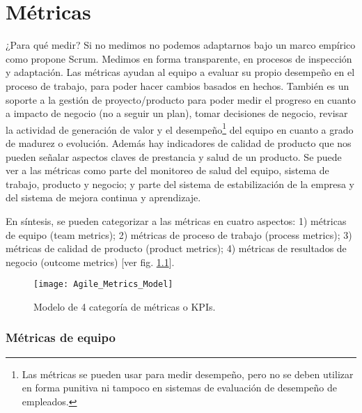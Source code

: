 \chapter{Métricas}

¿Para qué medir? Si no medimos no podemos adaptarnos bajo un marco empírico como propone Scrum. Medimos en forma transparente, en procesos de inspección y adaptación. Las métricas ayudan al equipo a evaluar su propio desempeño en el proceso de trabajo, para poder hacer cambios basados en hechos. También es un soporte a la gestión de proyecto/producto para poder medir el progreso en cuanto a impacto de negocio (no a seguir un plan), tomar decisiones de negocio, revisar la actividad de generación de valor y el desempeño\footnote{Las métricas se pueden usar para medir desempeño, pero no se deben utilizar en forma punitiva ni tampoco en sistemas de evaluación de desempeño de empleados.} del equipo en cuanto a grado de madurez o evolución. Además hay indicadores de calidad de producto que nos pueden señalar aspectos claves de prestancia y salud de un producto. Se puede ver a las métricas como parte del monitoreo de salud del equipo, sistema de trabajo, producto y negocio; y parte del sistema de estabilización de la empresa y del sistema de mejora continua y aprendizaje.

En síntesis, se pueden categorizar a las métricas en cuatro aspectos: 1) métricas de equipo (team metrics); 2) métricas de proceso de trabajo (process metrics); 3) métricas de calidad de producto (product metrics); 4) métricas de resultados de negocio (outcome metrics) [ver fig. \ref{fig:Agile_Metrics_Model}].

\begin{figure}[h]
  \centering
  \texttt{[image: Agile\_Metrics\_Model]}
  \caption{Modelo de 4 categoría de métricas o KPIs.}
  \centering
  \label{fig:Agile_Metrics_Model} %
\end{figure}
\FloatBarrier %

\subsection{Métricas de equipo}

